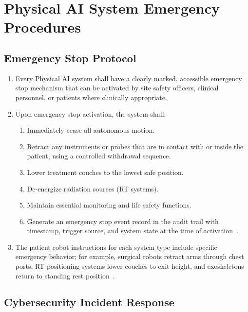 \documentclass[11pt,letterpaper]{article}
\begin{document}
\section{Physical AI System Emergency Procedures}

\subsection{Emergency Stop Protocol}

\begin{enumerate}[label=(\alph*)]
\item Every Physical AI system shall have a clearly marked, accessible emergency
  stop mechanism that can be activated by site safety officers, clinical
  personnel, or patients where clinically appropriate.

\item Upon emergency stop activation, the system shall:
  \begin{enumerate}[label=(\arabic*)]
  \item Immediately cease all autonomous motion.
  \item Retract any instruments or probes that are in contact with or
    inside the patient, using a controlled withdrawal sequence.
  \item Lower treatment couches to the lowest safe position.
  \item De-energize radiation sources (RT systems).
  \item Maintain essential monitoring and life safety functions.
  \item Generate an emergency stop event record in the audit trail with
    timestamp, trigger source, and system state at the time of
    activation~\cite{iche6r3adapt}.
  \end{enumerate}

\item The patient robot instructions for each system type include specific
  emergency behavior; for example, surgical robots retract arms through chest
  ports, RT positioning systems lower couches to exit height, and
  exoskeletons return to standing rest position~\cite{patientinstructions2026}.
\end{enumerate}

\subsection{Cybersecurity Incident Response}
\end{document}
